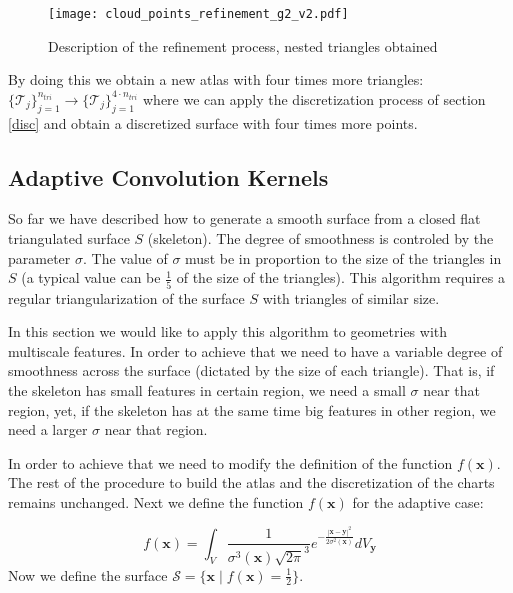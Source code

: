 \documentclass[11pt]{article}
\newcommand\bx{\boldsymbol x}
\newcommand\by{\boldsymbol y}
\begin{document}
\begin{figure}[H]
\begin{center}
\texttt{[image: cloud\_points\_refinement\_g2\_v2.pdf]}%
\end{center}
\caption{Description of the refinement process, nested triangles obtained}
\label{refinement3}
\end{figure}


By doing this we obtain a new atlas with four times more triangles: $\{\mathcal{T}_j\}_{j=1}^{n_{tri}}\rightarrow \{\mathcal{T}_j\}_{j=1}^{4\cdot n_{tri}}$ where we can apply the discretization process of section \ref{disc} and obtain a discretized surface with four times more points. 






\subsection{Adaptive Convolution Kernels}

So far we have described how to generate a smooth surface from a closed flat triangulated surface $\mathit{S}$ (skeleton). The degree of smoothness is controled by the parameter $\sigma$. The value of $\sigma$ must be in proportion to the size of the triangles in $\mathit{S}$ (a typical value can be $\frac{1}{5}$ of the size of the triangles). This algorithm requires a regular triangularization of the surface $\mathit{S}$ with triangles of similar size.

In this section we would like to apply this algorithm to geometries with multiscale features. In order to achieve that we need to have a variable degree of smoothness across the surface (dictated by the size of each triangle). That is, if the skeleton has small features in certain region, we need a small $\sigma$ near that region, yet, if the skeleton has at the same time big features in other region, we need a larger $\sigma$ near that region.

In order to achieve that we need to modify the definition of the function $f(\bx)$. The rest of the procedure to build the atlas and the discretization of the charts remains unchanged. Next we define the function $f(\bx)$ for the adaptive case:

\begin{equation}
f(\bx)=\int_{V}\frac{1}{\sigma ^3(\bx)\sqrt{2\pi}^3}e^{-\frac{|\bx-\by|^2}{2\sigma^2(\bx)}}dV_{\by}
\end{equation}
Now we define the surface $\mathcal{S}=\{\bx \mid f(\bx)=\frac{1}{2}\}$.
\end{document}
